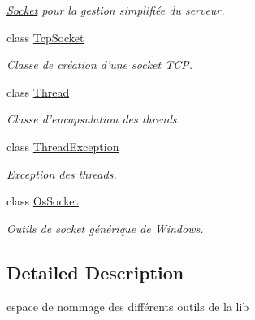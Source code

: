 \begin{DoxyCompactItemize}
\begin{DoxyCompactList}\small\item\em \hyperlink{classmognetwork_1_1_socket}{Socket} pour la gestion simplifiée du serveur. \end{DoxyCompactList}\item 
class \hyperlink{classmognetwork_1_1_tcp_socket}{Tcp\-Socket}
\begin{DoxyCompactList}\small\item\em Classe de création d'une socket T\-C\-P. \end{DoxyCompactList}\item 
class \hyperlink{classmognetwork_1_1_thread}{Thread}
\begin{DoxyCompactList}\small\item\em Classe d'encapsulation des threads. \end{DoxyCompactList}\item 
class \hyperlink{classmognetwork_1_1_thread_exception}{Thread\-Exception}
\begin{DoxyCompactList}\small\item\em Exception des threads. \end{DoxyCompactList}\item 
class \hyperlink{classmognetwork_1_1_os_socket}{Os\-Socket}
\begin{DoxyCompactList}\small\item\em Outils de socket générique de Windows. \end{DoxyCompactList}\end{DoxyCompactItemize}


\subsection{Detailed Description}
espace de nommage des différents outils de la lib 